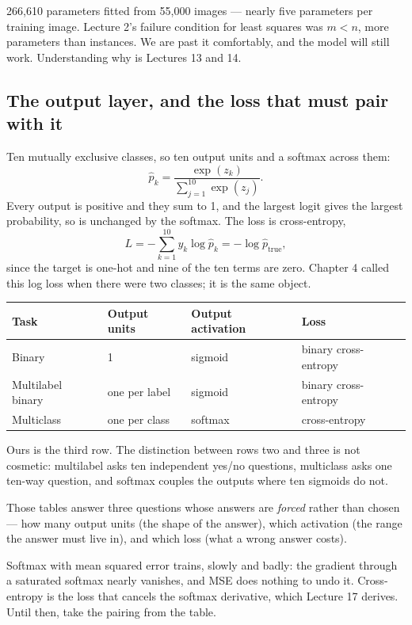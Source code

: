 \documentclass[11pt,a4paper]{article}
\begin{document}
266{,}610 parameters fitted from 55{,}000 images --- nearly five parameters per
training image. Lecture 2's failure condition for least squares was $m < n$,
more parameters than instances. We are past it comfortably, and the model will
still work. Understanding why is Lectures 13 and 14.

\subsection{The output layer, and the loss that must pair with it}

Ten mutually exclusive classes, so ten output units and a softmax across them:
\[ \hat p_k = \frac{\exp(z_k)}{\sum_{j=1}^{10}\exp(z_j)}. \]
Every output is positive and they sum to 1, and the largest logit gives the
largest probability, so  is unchanged by the softmax. The loss is
cross-entropy,
\[ L = -\sum_{k=1}^{10} y_k\log\hat p_k = -\log\hat p_{\text{true}}, \]
since the target is one-hot and nine of the ten terms are zero. Chapter 4
called this log loss when there were two classes; it is the same object.

\begin{center}
\small
\begin{tabular}{llll}
\toprule
\textbf{Task} & \textbf{Output units} & \textbf{Output activation} &
\textbf{Loss} \\
\midrule
Binary & 1 & sigmoid & binary cross-entropy \\
Multilabel binary & one per label & sigmoid & binary cross-entropy \\
Multiclass & one per class & softmax & cross-entropy \\
\bottomrule
\end{tabular}
\end{center}

Ours is the third row. The distinction between rows two and three is not
cosmetic: multilabel asks ten independent yes/no questions, multiclass asks one
ten-way question, and softmax couples the outputs where ten sigmoids do not.

Those tables answer three questions whose answers are \emph{forced} rather than
chosen --- how many output units (the shape of the answer), which activation
(the range the answer must live in), and which loss (what a wrong answer
costs).

\begin{failbox}[title={Failure condition --- the pairing is not optional}]
Softmax with mean squared error trains, slowly and badly: the gradient through
a saturated softmax nearly vanishes, and MSE does nothing to undo it.
Cross-entropy is the loss that cancels the softmax derivative, which Lecture 17
derives. Until then, take the pairing from the table.
\end{failbox}
\end{document}
